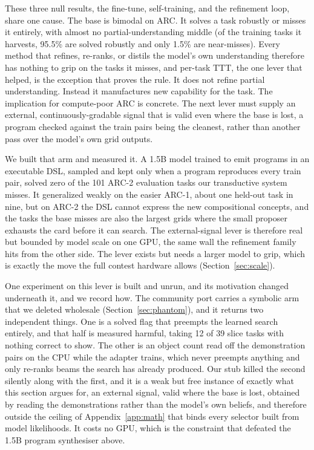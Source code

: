 \documentclass[11pt]{article}
\begin{document}
These three null results, the fine-tune, self-training, and the refinement loop, share one cause. The
base is bimodal on ARC. It solves a task robustly or misses it entirely, with almost no
partial-understanding middle (of the training tasks it harvests, 95.5\% are solved robustly and only
1.5\% are near-misses). Every method that refines, re-ranks, or distils the model's own understanding
therefore has nothing to grip on the tasks it misses, and per-task TTT, the one lever that helped, is
the exception that proves the rule. It does not refine partial understanding. Instead it manufactures new
capability for the task. The implication for compute-poor ARC is concrete. The next lever must supply
an external, continuously-gradable signal that is valid even where the base is lost, a program checked
against the train pairs being the cleanest, rather than another pass over the model's own grid outputs.

We built that arm and measured it. A 1.5B model trained to emit programs in an executable DSL, sampled and
kept only when a program reproduces every train pair, solved zero of the 101 ARC-2 evaluation tasks our
transductive system misses. It generalized weakly on the easier ARC-1, about one held-out task in nine, but
on ARC-2 the DSL cannot express the new compositional concepts, and the tasks the base misses are also the
largest grids where the small proposer exhausts the card before it can search. The external-signal lever is
therefore real but bounded by model scale on one GPU, the same wall the refinement family hits from the
other side. The lever exists but needs a larger model to grip, which is exactly the move the full contest
hardware allows (Section~\ref{sec:scale}).

One experiment on this lever is built and unrun, and its motivation changed underneath it, and we record
how. The community port carries a symbolic arm that we deleted wholesale (Section~\ref{sec:phantom}),
and it returns two independent things. One is a solved flag that preempts the learned search entirely,
and that half is measured harmful, taking 12 of 39 slice tasks with nothing correct to show. The other is
an object count read off the demonstration pairs on the CPU while the adapter trains, which never
preempts anything and only re-ranks beams the search has already produced. Our stub killed the second
silently along with the first, and it is a weak but free instance of exactly what this section argues for,
an external signal, valid where the base is lost, obtained by reading the demonstrations rather than the
model's own beliefs, and therefore outside the ceiling of Appendix~\ref{app:math} that binds every
selector built from model likelihoods. It costs no GPU, which is the constraint that defeated the 1.5B
program synthesiser above.
\end{document}
